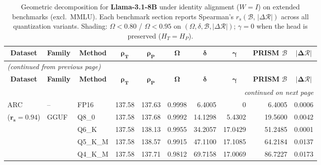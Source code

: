 \begingroup
\small
\setlength{\tabcolsep}{4pt}
\renewcommand{\arraystretch}{1.05}
\setlength{\LTcapwidth}{\textwidth}
\begin{longtable}{ll l rrrrrrr}
\caption{Geometric decomposition for \textbf{Llama-3.1-8B} under identity alignment ($W{=}I$) on extended benchmarks (excl.\ MMLU). Each benchmark section reports Spearman's $r_s(\mathcal{B},\,|\Delta\mathcal{R}|)$ across all quantization variants. Shading: \colorbox{red!35}{$\Omega{<}0.80$} / \colorbox{red!18}{$\Omega{<}0.95$} on $(\Omega,\delta,\mathcal{B},|\Delta\mathcal{R}|)$; \colorbox{cyan!12}{$\gamma{=}0$} when the head is preserved ($H_T{=}H_P$).}\label{tab:llama_decomposition_ext_bound}\\
\toprule
\multicolumn{1}{c}{\textbf{Dataset}} & \multicolumn{1}{c}{\textbf{Family}} & \multicolumn{1}{c}{\textbf{Method}} & \multicolumn{1}{c}{$\boldsymbol{\rho_T}$} & \multicolumn{1}{c}{$\boldsymbol{\rho_P}$} & \multicolumn{1}{c}{$\boldsymbol{\Omega}$} & \multicolumn{1}{c}{$\boldsymbol{\delta}$} & \multicolumn{1}{c}{$\boldsymbol{\gamma}$} & \multicolumn{1}{c}{\textbf{PRISM} $\boldsymbol{\mathcal{B}}$} & \multicolumn{1}{c}{$\boldsymbol{|\Delta\mathcal{R}|}$} \\
\midrule
\endfirsthead
\multicolumn{10}{l}{\small\itshape (continued from previous page)}\\
\toprule
\multicolumn{1}{c}{\textbf{Dataset}} & \multicolumn{1}{c}{\textbf{Family}} & \multicolumn{1}{c}{\textbf{Method}} & \multicolumn{1}{c}{$\boldsymbol{\rho_T}$} & \multicolumn{1}{c}{$\boldsymbol{\rho_P}$} & \multicolumn{1}{c}{$\boldsymbol{\Omega}$} & \multicolumn{1}{c}{$\boldsymbol{\delta}$} & \multicolumn{1}{c}{$\boldsymbol{\gamma}$} & \multicolumn{1}{c}{\textbf{PRISM} $\boldsymbol{\mathcal{B}}$} & \multicolumn{1}{c}{$\boldsymbol{|\Delta\mathcal{R}|}$} \\
\midrule
\endhead
\midrule
\multicolumn{10}{r}{\small\itshape continued on next page}\\
\endfoot
\bottomrule
\endlastfoot
ARC & -- & FP16 & 137.58 & 137.63 & 0.9998 & 6.4005 & \cellcolor{cyan!12} $0$ & 6.4005 & 0.0006 \\
{\small ($\mathbf{r_s{=}0.94}$)} & GGUF & Q8\_0 & 137.58 & 137.68 & 0.9992 & 14.1298 & 5.4302 & 19.5600 & 0.0042 \\
 &  & Q6\_K & 137.58 & 138.13 & 0.9955 & 34.2057 & 17.0429 & 51.2485 & 0.0001 \\
 &  & Q5\_K\_M & 137.58 & 138.57 & 0.9915 & 47.1100 & 17.1085 & 64.2184 & 0.0137 \\
 &  & Q4\_K\_M & 137.58 & 137.71 & 0.9812 & 69.7158 & 17.0069 & 86.7227 & 0.0173 \\

\end{longtable}
